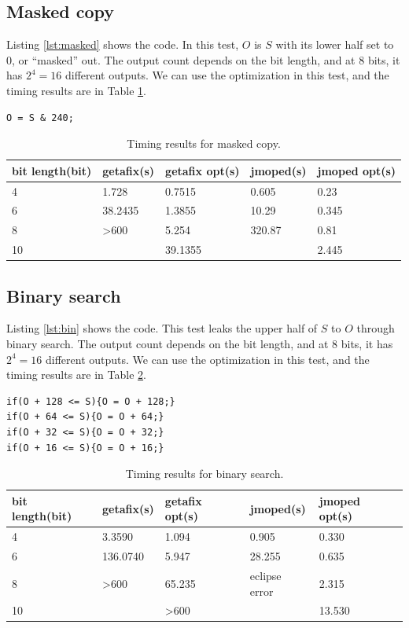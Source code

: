 \subsection{Masked copy}
Listing \ref{lst:masked} shows the code. In this test, $O$ is $S$ with its lower half set to $0$, or ``masked'' out. The output count depends on the bit length, and at $8$ bits, it has $2^{4} = 16$ different outputs. We can use the optimization in this test, and the timing results are in Table \ref{tbl:masked}.

\lstset{language=C}  
\begin{lstlisting}[caption={Masked copy test program at 8 bits.},label=lst:masked]
O = S & 240;
\end{lstlisting}

\begin{table}[htbp]
\begin{tabular}{|l|l|l|l|l|}
\hline
{bit length(bit)} & getafix(s) & {getafix opt(s)} & jmoped(s) & {jmoped opt(s)} \\ \hline
4 & 1.728 & 0.7515 & 0.605 & 0.23 \\ \hline
6 & 38.2435 & 1.3855 & 10.29 & 0.345 \\ \hline
8 & \textgreater 600 & 5.254 & 320.87 & 0.81 \\ \hline
10 &  & 39.1355 &  & 2.445 \\ \hline
\end{tabular}
\caption{Timing results for masked copy.}
\label{tbl:masked}
\end{table}

\subsection{Binary search}
Listing \ref{lst:bin} shows the code. This test leaks the upper half of $S$ to $O$ through binary search. The output count depends on the bit length, and at $8$ bits, it has $2^{4} = 16$ different outputs. We can use the optimization in this test, and the timing results are in Table \ref{tbl:bin}.

\lstset{language=C}  
\begin{lstlisting}[caption={Binary search test program at 8 bits.},label=lst:bin]
if(O + 128 <= S){O = O + 128;}
if(O + 64 <= S){O = O + 64;}
if(O + 32 <= S){O = O + 32;}
if(O + 16 <= S){O = O + 16;}
\end{lstlisting}

\begin{table}[htbp]
\begin{tabular}{|l|l|l|l|l|}
\hline
{bit length(bit)} & getafix(s) & {getafix opt(s)} & jmoped(s) & {jmoped opt(s)} \\ \hline
4 & 3.3590 & 1.094 & 0.905 & 0.330 \\ \hline
6 & 136.0740 & 5.947 & 28.255 & 0.635 \\ \hline
8 & \textgreater 600 & 65.235 & eclipse error & 2.315 \\ \hline
10 &  & \textgreater 600 &  & 13.530 \\ \hline
\end{tabular}
\caption{Timing results for binary search.}
\label{tbl:bin}
\end{table}

